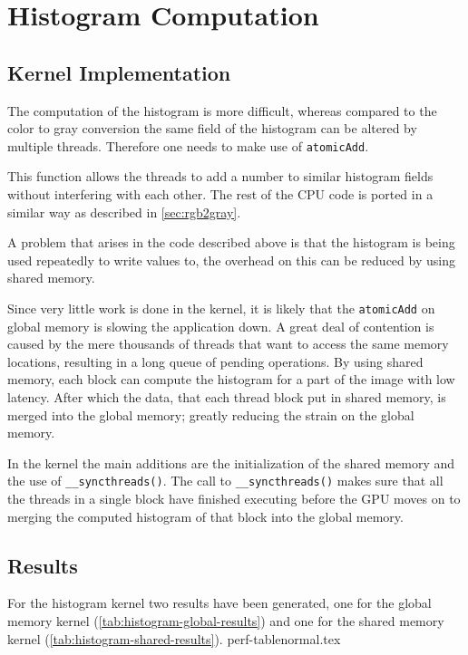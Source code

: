 \documentclass[final]{report}
\begin{document}
\chapter{Histogram Computation}

\section{Kernel Implementation}\label{sec:hist-kernel}
The computation of the histogram is more difficult, whereas compared to the color to gray conversion the same field of the histogram can be altered by multiple threads.
Therefore one needs to make use of \texttt{atomicAdd\(\)}.


This function allows the threads to add a number to similar histogram fields without interfering with each other.
The rest of the CPU code is ported in a similar way as described in \cref{sec:rgb2gray}.

A problem that arises in the code described above is that the histogram is being used repeatedly to write values to, the overhead on this can be reduced by using shared memory.

Since very little work is done in the kernel, it is likely that the \texttt{atomicAdd\(\)} on global memory is slowing the application down.
A great deal of contention is caused by the mere thousands of threads that want to access the same memory locations, resulting in a long queue of pending operations.
By using shared memory, each block can compute the histogram for a part of the image with low latency.
After which the data, that each thread block put in shared memory, is merged into the global memory; greatly reducing the strain on the global memory.

In the kernel the main additions are the initialization of the shared memory and the use of \texttt{\_\_syncthreads()}.
The call to \texttt{\_\_syncthreads()} makes sure that all the threads in a single block have finished executing before the GPU moves on to merging the computed histogram of that block into the global memory.

\section{Results}
For the histogram kernel two results have been generated, one for the global memory kernel (\cref{tab:histogram-global-results}) and one for the shared memory kernel (\cref{tab:histogram-shared-results}).
{perf-tablenormal.tex}
\end{document}
